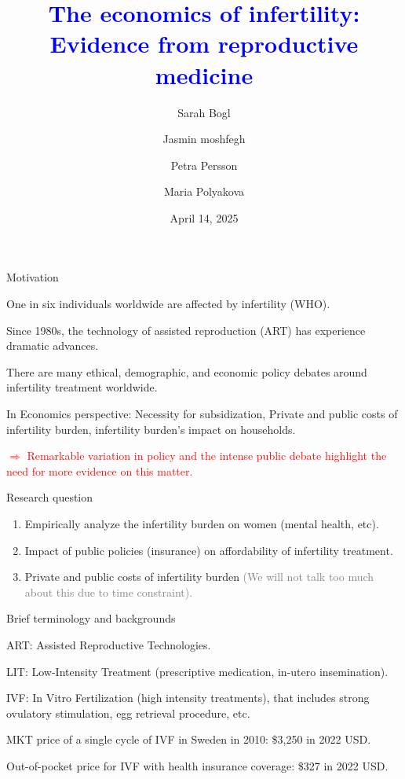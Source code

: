 \documentclass[notes,11pt, aspectratio=169]{beamer}
\title{\textcolor{blue}{The economics of infertility:\\ Evidence from reproductive medicine}}
\author{Sarah Bogl \and Jasmin moshfegh \and Petra Persson \and Maria Polyakova}
\institute{\textit{R\&R at QJE}}
\date{April 14, 2025}
\newenvironment{wideitemize}{\itemize\addtolength{\itemsep}{0.4em}}{\enditemize}
\begin{document}
\begin{frame}[plain]
	\titlepage
\end{frame}

\setcounter{framenumber}{0}

\begin{frame}{Motivation}
	\begin{wideitemize}
		\item One in six individuals worldwide are affected by infertility (WHO).
		\item Since 1980s, the technology of assisted reproduction (ART) has experience dramatic advances.
		\item There are many ethical, demographic, and economic policy debates around infertility treatment worldwide.
		\item In Economics perspective: Necessity for subsidization, Private and public costs of infertility burden, infertility burden's impact on households.
		\item[\textcolor{red}{$\Rightarrow$}] \textcolor{red}{Remarkable variation in policy and the intense public debate highlight the need for more evidence on this matter.}
	\end{wideitemize}

\end{frame}

\begin{frame}{Research question}
	\begin{enumerate}
		\item Empirically analyze the infertility burden on women (mental health, etc).
		\item Impact of public policies (insurance) on affordability of infertility treatment.
		\item Private and public costs of infertility burden \textcolor{gray}{(We will not talk too much about this due to time constraint).}
	\end{enumerate}	
\end{frame}

\begin{frame}{Brief terminology and backgrounds}
	\begin{wideitemize}
		\item ART: Assisted Reproductive Technologies.
		\item LIT: Low-Intensity Treatment (prescriptive medication, in-utero insemination).
		\item IVF: In Vitro Fertilization (high intensity treatments), that includes strong ovulatory stimulation, egg retrieval procedure, etc.
		\item MKT price of a single cycle of IVF in Sweden in 2010: \$3,250 in 2022 USD.
		\item Out-of-pocket price for IVF with health insurance coverage: \$327 in 2022 USD.
	\end{wideitemize}
\end{frame}
\end{document}
